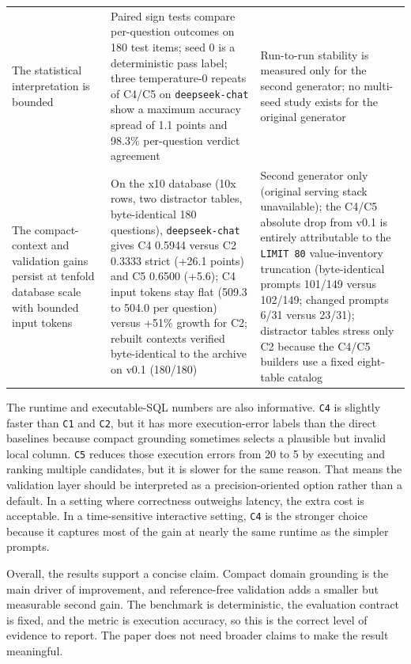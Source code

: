 \documentclass{ieeeaccess}
\begin{document}
\begin{table}[t]
\begin{tabularx}{\textwidth}{p{}Xp{}}
The statistical interpretation is bounded & Paired sign tests compare per-question outcomes on 180 test items; seed 0 is a deterministic pass label; three temperature-0 repeats of C4/C5 on \texttt{deepseek-chat} show a maximum accuracy spread of 1.1 points and 98.3\% per-question verdict agreement & Run-to-run stability is measured only for the second generator; no multi-seed study exists for the original generator \\
The compact-context and validation gains persist at tenfold database scale with bounded input tokens & On the x10 database (10x rows, two distractor tables, byte-identical 180 questions), \texttt{deepseek-chat} gives C4 0.5944 versus C2 0.3333 strict (+26.1 points) and C5 0.6500 (+5.6); C4 input tokens stay flat (509.3 to 504.0 per question) versus +51\% growth for C2; rebuilt contexts verified byte-identical to the archive on v0.1 (180/180) & Second generator only (original serving stack unavailable); the C4/C5 absolute drop from v0.1 is entirely attributable to the \texttt{LIMIT 80} value-inventory truncation (byte-identical prompts 101/149 versus 102/149; changed prompts 6/31 versus 23/31); distractor tables stress only C2 because the C4/C5 builders use a fixed eight-table catalog \\
\bottomrule
\end{tabularx}
\end{table}

The runtime and executable-SQL numbers are also informative. \texttt{C4} is slightly faster than \texttt{C1} and \texttt{C2}, but it has more execution-error labels than the direct baselines because compact grounding sometimes selects a plausible but invalid local column. \texttt{C5} reduces those execution errors from 20 to 5 by executing and ranking multiple candidates, but it is slower for the same reason. That means the validation layer should be interpreted as a precision-oriented option rather than a default. In a setting where correctness outweighs latency, the extra cost is acceptable. In a time-sensitive interactive setting, \texttt{C4} is the stronger choice because it captures most of the gain at nearly the same runtime as the simpler prompts.

Overall, the results support a concise claim. Compact domain grounding is the main driver of improvement, and reference-free validation adds a smaller but measurable second gain. The benchmark is deterministic, the evaluation contract is fixed, and the metric is execution accuracy, so this is the correct level of evidence to report. The paper does not need broader claims to make the result meaningful.
\end{document}
